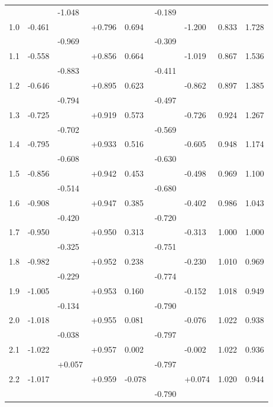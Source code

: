 \documentclass[12pt,oneside]{book}
\begin{document}
{\begin{longtable}{@{}lllllllll@{}}
    &   & -1.048 &   &   & -0.189 &   &   &   \\
1.0   & -0.461 &   & +0.796 & 0.694 &   & -1.200 & 0.833 & 1.728 \\
    &   & -0.969 &   &   & -0.309 &   &   &   \\
1.1   & -0.558 &   & +0.856 & 0.664 &   & -1.019 & 0.867 & 1.536 \\
    &   & -0.883 &   &   & -0.411 &   &   &   \\
1.2   & -0.646 &   & +0.895 & 0.623 &   & -0.862 & 0.897 & 1.385 \\
    &   & -0.794 &   &   & -0.497 &   &   &   \\
1.3   & -0.725 &   & +0.919 & 0.573 &   & -0.726 & 0.924 & 1.267 \\
    &   & -0.702 &   &   & -0.569 &   &   &   \\
1.4   & -0.795 &   & +0.933 & 0.516 &   & -0.605 & 0.948 & 1.174 \\
    &   & -0.608 &   &   & -0.630 &   &   &   \\
1.5   & -0.856 &   & +0.942 & 0.453 &   & -0.498 & 0.969 & 1.100 \\
    &   & -0.514 &   &   & -0.680 &   &   &   \\
1.6   & -0.908 &   & +0.947 & 0.385 &   & -0.402 & 0.986 & 1.043 \\
    &   & -0.420 &   &   & -0.720 &   &   &   \\
1.7   & -0.950 &   & +0.950 & 0.313 &   & -0.313 & 1.000 & 1.000 \\
    &   & -0.325 &   &   & -0.751 &   &   &   \\
1.8   & -0.982 &   & +0.952 & 0.238 &   & -0.230 & 1.010 & 0.969 \\
    &   & -0.229 &   &   & -0.774 &   &   &   \\
1.9   & -1.005 &   & +0.953 & 0.160 &   & -0.152 & 1.018 & 0.949 \\
    &   & -0.134 &   &   & -0.790 &   &   &   \\
2.0   & -1.018 &   & +0.955 & 0.081 &   & -0.076 & 1.022 & 0.938 \\
    &   & -0.038 &   &   & -0.797 &   &   &   \\
2.1   & -1.022 &   & +0.957 & 0.002 &   & -0.002 & 1.022 & 0.936 \\
    &   & +0.057 &   &   & -0.797 &   &   &   \\
2.2   & -1.017 &   & +0.959 & -0.078 &   & +0.074 & 1.020 & 0.944 \\
    &   &   &   &   & -0.790 &   &   &   \\

\end{longtable}}
\end{document}
